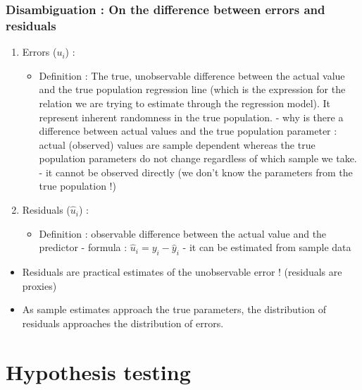 \documentclass{article}
\begin{document}
\subsubsection{Disambiguation : On the difference between errors and residuals}
\begin{enumerate}
    \item Errors ($u_i$) : 
    \begin{itemize}
        \item Definition : The true, unobservable difference between the actual value and the true population regression line (which is the expression for the relation we are trying to estimate through the regression model). It represent inherent randomness in the true population.  
        \subitem - why is there a difference between actual values and the true population parameter : actual (observed) values are sample dependent whereas the true population parameters do not change regardless of which sample we take. 
        \subitem - it cannot be observed directly (we don't know the parameters from the true population !)
        
    \end{itemize}
    \item Residuals ($\hat{u}_i$) : 
    \begin{itemize}
        \item Definition : observable difference between the actual value and the predictor 
        \subitem - formula : $\hat{u}_i=y_i-\hat{y}_i$
        \subitem - it can be estimated from sample data
    \end{itemize}
\end{enumerate}
\begin{linkbox}
\begin{itemize}
    \item Residuals are practical estimates of the unobservable error ! (residuals are proxies)
    \item As sample estimates approach the true parameters, the distribution of residuals approaches the distribution of errors.
\end{itemize}    
\end{linkbox}


\section{Hypothesis testing}
\end{document}
